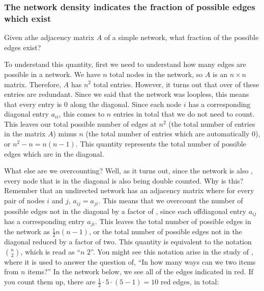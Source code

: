 \documentclass[letterpaper,10pt,english]{jupyterBook}
\begin{document}
\subsubsection{The network density indicates the fraction of possible edges which exist}
\label{\detokenize{representations/ch4/properties-of-networks:the-network-density-indicates-the-fraction-of-possible-edges-which-exist}}
\sphinxAtStartPar
Given athe adjacency matrix \(A\) of a simple network, what fraction of the possible edges  exist?

\sphinxAtStartPar
To understand this quantity, first we need to understand how many edges are possible in a network. We have \(n\) total nodes in the network, so \(A\) is an \(n \times n\) matrix. Therefore, \(A\) has \(n^2\) total entries. However, it turns out that over  of these entries are redundant. Since we said that the network was loopless, this means that every entry is  \(0\) along the diagonal. Since each node \(i\) has a corresponding diagonal entry \(a_{ii}\), this comes to \(n\) entries in total that we do not need to count. This leaves our total possible number of edges at \(n^2\) (the total number of entries in the matrix \(A\)) minus \(n\) (the total number of entries which are automatically \(0\)), or \(n^2 - n = n(n - 1)\). This quantity represents the total number of possible edges which are  in the diagonal.

\sphinxAtStartPar
What else are we overcounting? Well, as it turns out, since the network is also , every node that is  in the diagonal is also being double counted. Why is this? Remember that an undirected network has an adjacency matrix where for every pair of nodes \(i\) and \(j\), \(a_{ij} = a_{ji}\). This means that we overcount the number of possible edges not in the diagonal by a factor of , since each off\sphinxhyphen{}diagonal entry \(a_{ij}\) has a corresponding entry \(a_{ji}\). This leaves the total number of possible edges in the network as \(\frac{1}{2}n(n - 1)\), or the total number of possible edges not in the diagonal reduced by a factor of two. This quantity is equivalent to the notation \(\binom n 2\), which is read as “\(n\)  \(2\)”. You might see this notation arise in the study of , where it is used to answer the question of, “In how many ways can we  two items from \(n\) items?” In the network below, we see all of the  edges indicated in red. If you count them up, there are \(\frac{1}{2}\cdot 5 \cdot (5 - 1) = 10\) red edges, in total:
\end{document}
